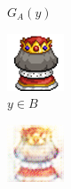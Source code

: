 \documentclass[twocolumn,11pt]{ctexart}
\begin{document}
\begin{figure}[htb]
\begin{subfigure}[b]{0.23\linewidth}
        \caption{$G_A(y)$}
      \end{subfigure}
      \begin{subfigure}[b]{0.23\linewidth}
        \includegraphics[width=\linewidth]{exp2_epoch004_real_B.png}
        \caption{$y \in B$}
      \end{subfigure}
      \begin{subfigure}[b]{0.23\linewidth}
        \includegraphics[width=\linewidth]{exp2_epoch004_fake_A.png}

\end{subfigure}
\end{figure}
\end{document}
